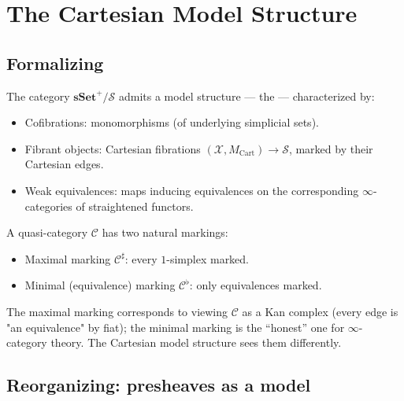 \section{The Cartesian Model Structure}
\label{sec:cartesian-model}

\subsection{Formalizing}

\begin{theorem}
\label{thm:cartesian-model}
The category $\mathbf{sSet}^+\!/\mathcal{S}$ admits a model structure —
the  — characterized by:
\begin{itemize}
  \item Cofibrations: monomorphisms (of underlying simplicial sets).
  \item Fibrant objects: Cartesian fibrations $(\mathcal{X}, M_{\mathrm{Cart}}) \to \mathcal{S}$,
        marked by their Cartesian edges.
  \item Weak equivalences: maps inducing equivalences on the corresponding
        $\infty$-categories of straightened functors.
\end{itemize}
\end{theorem}

\begin{remark}
A quasi-category $\mathcal{C}$ has two natural markings:
\begin{itemize}
  \item Maximal marking $\mathcal{C}^\sharp$: every $1$-simplex marked.
  \item Minimal (equivalence) marking $\mathcal{C}^\flat$: only
        equivalences marked.
\end{itemize}
The maximal marking corresponds to viewing $\mathcal{C}$ as a Kan complex
(every edge is "an equivalence" by fiat); the minimal marking is the
``honest'' one for $\infty$-category theory. The Cartesian model structure
sees them differently.
\end{remark}

\subsection{Reorganizing: presheaves as a model}

